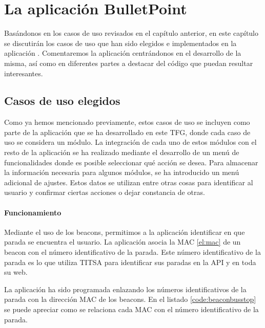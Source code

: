 %
%
%

\chapter{La aplicación BulletPoint} \label{chap:LaAplicacion} 

Basándonos en los casos de uso revisados en el capítulo anterior, en este capítulo se discutirán los casos de uso que han sido elegidos e implementados en la aplicación \BulletPoint{}. Comentaremos la aplicación centrándonos en el desarrollo de la misma, así como  en diferentes partes a destacar del código que puedan resultar interesantes.


\section{Casos de uso elegidos}

Como ya hemos mencionado previamente, estos casos de uso se incluyen como parte de la aplicación que se ha desarrollado en este TFG, donde cada caso de uso se considera un módulo. La integración de cada uno de estos módulos con el resto de la aplicación se ha realizado mediante el desarrollo de un menú de funcionalidades donde es posible seleccionar qué acción se desea. Para almacenar la información necesaria para algunos módulos, se ha introducido un menú adicional de ajustes. Estos datos se utilizan entre otras cosas para identificar al usuario y confirmar ciertas acciones o dejar constancia de otras. 


\subsubsection{Funcionamiento}


Mediante el uso de los beacons, permitimos a la aplicación identificar en que parada se encuentra el usuario. La aplicación asocia la MAC \ref{el:mac} de un beacon con el número identificativo de la parada. Este número identificativo de la parada es lo que utiliza TITSA para identificar sus paradas en la API y en toda su web. 


La aplicación ha sido programada enlazando los números identificativos de la parada con la dirección MAC de los beacons. En el listado \ref{code:beaconbusstop} se puede apreciar como se relaciona cada MAC con el número identificativo de la parada.


